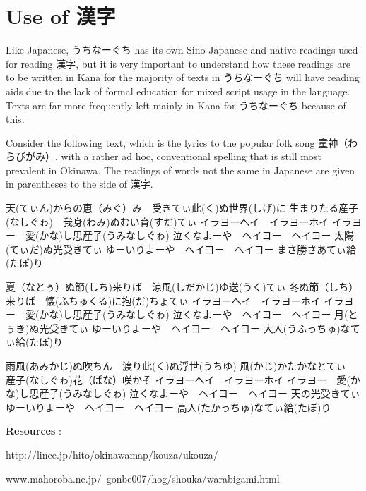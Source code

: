 \section{Use of 漢字}
 
\par{ Like Japanese, うちなーぐち has its own Sino-Japanese and native readings used for reading 漢字, but it is very important to understand how these readings are to be written in Kana for the majority of texts in うちなーぐち will have reading aids due to the lack of formal education for mixed script usage in the language. Texts are far more frequently left mainly in Kana for うちなーぐち because of this. }

\par{ Consider the following text, which is the lyrics to the popular folk song 童神（わらびがみ）, with a rather ad hoc, conventional spelling that is still most prevalent in Okinawa. The readings of words not the same in Japanese are given in parentheses to the side of 漢字. }

\par{天(てぃん)からの恵（みぐ）み　受きてぃ此(く)ぬ世界(しげ)に \hfill\break
生まりたる産子(なしぐゎ)　我身(わみ)ぬむい育(すだ)てぃ \hfill\break
イラヨーヘイ　イラヨーホイ \hfill\break
イラヨー　愛(かな)し思産子(うみなしぐゎ) \hfill\break
泣くなよーや　ヘイヨー　ヘイヨー \hfill\break
太陽(てぃだ)ぬ光受きてぃ \hfill\break
ゆーいりよーや　ヘイヨー　ヘイヨー \hfill\break
まさ勝さあてぃ給(たぼ)り }

\par{夏（なとぅ）ぬ節(しち)来りば　涼風(しだかじ)ゆ送(うく)てぃ \hfill\break
冬ぬ節（しち）来りば　懐(ふちゅくる)に抱(だ)ちょてぃ \hfill\break
イラヨーヘイ　イラヨーホイ \hfill\break
イラヨー　愛(かな)し思産子(うみなしぐゎ) \hfill\break
泣くなよーや　ヘイヨー　ヘイヨー \hfill\break
月(とぅき)ぬ光受きてぃ \hfill\break
ゆーいりよーや　ヘイヨー　ヘイヨー \hfill\break
大人(うふっちゅ)なてぃ給(たぼ)り }

\par{雨風(あみかじ)ぬ吹ちん　渡り此(く)ぬ浮世(うちゆ) \hfill\break
風(かじ)かたかなとてぃ　産子(なしぐゎ)花（ぱな）咲かそ \hfill\break
イラヨーヘイ　イラヨーホイ \hfill\break
イラヨー　愛(かな)し思産子(うみなしぐゎ) \hfill\break
泣くなよーや　ヘイヨー　ヘイヨー \hfill\break
天の光受きてぃ \hfill\break
ゆーいりよーや　ヘイヨー　ヘイヨー \hfill\break
高人(たかっちゅ)なてぃ給(たぼ)り }

\par{\textbf{Resources }: }

\par{http:\slash \slash lince.jp\slash hito\slash okinawamap\slash kouza\slash ukouza\slash  }

\par{www.mahoroba.ne.jp\slash ~gonbe007\slash hog\slash shouka\slash warabigami.html‎ }
    